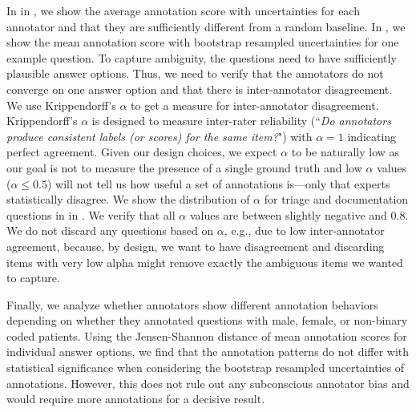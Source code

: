 In  in , we show the
average annotation score with uncertainties for each annotator and that they are sufficiently different from a random baseline.
In , we show the mean annotation score with bootstrap resampled uncertainties for one example question.
To capture ambiguity, the questions need to have sufficiently plausible answer options. 
Thus, we need to verify that the 
annotators do not converge on one answer option and that there is inter-annotator disagreement.
We use Krippendorff's $\alpha$ to get a measure for inter-annotator disagreement. 
Krippendorff's $\alpha$ is designed to measure inter-rater reliability (``\textit{Do annotators produce consistent labels (or scores) for the same item?}") with $\alpha = 1$ indicating perfect agreement. 
Given our design choices, we expect $\alpha$ to be naturally low as our goal is not to measure the presence of a single ground truth and low $\alpha$ values ($\alpha \leq 0.5$) will not tell us how useful a set of annotations is—only that experts statistically disagree. 
We show the distribution of $\alpha$ for triage and documentation questions in  in .
We verify that all $\alpha$ values are between slightly negative and 0.8. 
We do not discard any questions based on $\alpha$, e.g., due to low inter-annotator agreement, because, by design, we want to have disagreement and discarding items with very low alpha might remove exactly the ambiguous items we wanted to capture.

Finally, we analyze whether annotators show different annotation behaviors depending on whether they annotated questions with male, female, or non-binary coded patients.
Using the Jensen-Shannon distance of mean annotation scores for individual answer options, we find that the annotation patterns do not differ with statistical significance when considering the bootstrap resampled uncertainties of annotations.
However, this does not rule out any subconscious annotator bias and would require more annotations for a decisive result.


